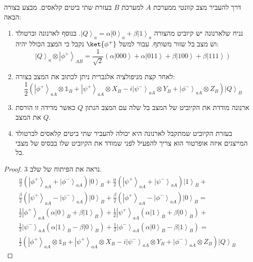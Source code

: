 \documentclass{tstextbook}
\begin{document}
\begin{proposition}
דרך להעביר מצב קוונטי ממערכת \(A\) למערכת \(B\) בעזרת שתי ביטים קלאסים. מבצע בצורה הבאה:

  \begin{enumerate}
    \item נניח שלארנונה יש קיוביט מהצורה \(\left|Q\right\rangle_{a}=\alpha\left|0\right\rangle_{a}+\beta\left|1\right\rangle_{a}\). בנוסף לארנונה וברטולד וש מצב בל שזור משותף. עבור למשל \(\ket{\phi^{+}}\) נקבל כי המצב הכולל יהיה: 
$$\left|Q\right\rangle_{a}\otimes\left|\phi^{+}\right\rangle_{A B}=\frac{1}{\sqrt{2}}\left(\alpha\left|000\right\rangle+\alpha\left|011\right\rangle+\beta\left|100\right\rangle+\beta\left|111\right\rangle\right)$$


    \item לאחר קצת מניפולציה אלגברית ניתן לכתוב את המצב בצורה: 
$$\frac{1}{2}\left(\left|\phi^{+}\right\rangle_{a A}\otimes\mathbb{1}_{B}+\left|\psi^{+}\right\rangle_{a A}\otimes X_{B}-i\left|\psi^{-}\right\rangle_{a A}\otimes Y_{B}+\left|\phi^{-}\right\rangle_{a A}\otimes Z_{B}\right)\left|Q\right\rangle_{B}$$


    \item ארנונה מודדת את הקיוביט של המצב בל שלה עם המצב הנתון \(Q\) כאשר מדידה זו הורסת את המצב \(Q\). 


    \item בעזרת הקיוביט שמתקבל לארנונה היא יכולה להעביר שתי ביטים קלאסים לברטולד המייצגים איזה אופרטור הוא צריך להפעיל לפני שמודד את הקיוביט שלו בבסיס של מצבי בל. 


  \end{enumerate}
\end{proposition}
\begin{proof}
נראה את הפיתוח של שלב 3.
\begin{gather*} \frac{\alpha}{2}\left(\left|\phi^{+}\right\rangle_{aA}+\left|\phi^{-}\right\rangle_{aA}\right)\left|0\right\rangle_{B}+\frac{\alpha}{2}\left(\left|\psi^{+}\right\rangle_{aA}+\left|\psi^{-}\right\rangle_{aA}\right)\left|1\right\rangle_{B}+\\ \frac{\beta}{2}\left(\left|\psi^+\right\rangle_{aA}-\left|\psi^-\right\rangle_{aA}\right)\left|0\right\rangle_B+\frac{\beta}{2}\left(\left|\phi^+\right\rangle_{aA}-\left|\phi^-\right\rangle_{aA}\right)\left|0\right\rangle_B=\\ \frac{1}{2}\left|\phi^{+}\right\rangle_{aA}\left( \alpha\left|0\right\rangle_{B}+\beta\left|1\right\rangle_{B} \right)+\frac{1}{2}\left|\psi^{+}\right\rangle_{aA}\left( \alpha\left|1\right\rangle_{B}+\beta\left|0\right\rangle_{B} \right)+\\ \frac{1}{2}\left|\psi^{-}\right\rangle_{aA}\left( \alpha\left|1\right\rangle_{B}-\beta\left|0\right\rangle_{B} \right)+\frac{1}{2}\left|\phi^{-}\right\rangle_{aA}\left( \alpha\left|0\right\rangle_{B}-\beta\left|1\right\rangle_{B} \right)=\\ \frac{1}{2}\left(\left|\phi^{+}\right\rangle_{aA}\otimes\mathbb{1}_{B}+\left|\psi^{+}\right\rangle_{aA}\otimes X_{B}-i\left|\psi^{-}\right\rangle_{aA}\otimes Y_{B}+\left|\phi^{-}\right\rangle_{aA}\otimes Z_{B}\right)\left|Q\right\rangle_{B}  
\end{gather*}

\end{proof}
\end{document}
